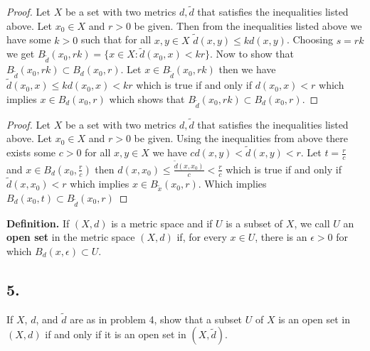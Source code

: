 \documentclass{amsart}
\theoremstyle{plain}
\theoremstyle{definition}
\theoremstyle{remark}
\begin{document}
\vspace{.15in}

\begin{proof}
    Let $X$ be a set with two metrics $d,\tilde{d}$ that satisfies the inequalities listed above. Let $x_0\in X$ and $r>0$ be given. Then from the inequalities listed above we have some $k>0$ such that for all $x,y \in X$ $\tilde{d}(x,y)\leq kd(x,y)$. Choosing $s=rk$ we get $B_{\tilde{d}}(x_0,rk)=\{x\in X: \tilde{d}(x_0,x)< kr\}$. Now to show that $B_{\tilde{d}}(x_0,rk)\subset B_{d}(x_0,r)$. Let $x\in B_{\tilde{d}}(x_0,rk)$ then we have $\tilde{d}(x_0,x)\leq kd(x_0,x)<kr$ which is true if and only if $d(x_0,x)<r$ which implies $x\in B_d(x_0,r)$ which shows that $B_{\tilde{d}}(x_0,rk)\subset B_d(x_0,r)$.



\end{proof}

\begin{proof}
    Let $X$ be a set with two metrics $d,\tilde{d}$ that satisfies the inequalities listed above. Let $x_0\in X$ and $r>0$ be given. Using the inequalities from above there exists some $c>0$ for all $x,y\in X$ we have $cd(x,y)<\tilde{d}(x,y)<r$. Let $t=\frac{r}{c}$ and $x\in B_d(x_0,\frac{r}{c})$ then $d(x,x_0)\leq \frac{\tilde{d}(x,x_0)}{c}<\frac{r}{c}$ which is true if and only if $\tilde{d}(x,x_0)<r$ which implies $x\in B_{\tilde{x}}(x_0,r)$. Which implies $B_d(x_0,t)\subset B_{\tilde{d}}(x_0,r)$
\end{proof}

\noindent
{\bfseries Definition.} If $(X,d)$ is a metric space and if $U$ is a subset of $X$, we call $U$ an {\bfseries open set} in the metric space $(X,d)$ if, for every $x\in U$, there is an $\epsilon >0$ for which $B_d(x,\epsilon ) \subset U$.

\vspace{.15in}

\noindent
\subsection*{5.} If $X$, $d$, and $\widetilde{d}$ are as in problem 4, show that a subset $U$ of $X$ is an open set in $(X,d)$ if and only if it is an open set in $(X,\widetilde{d})$.
\end{document}
